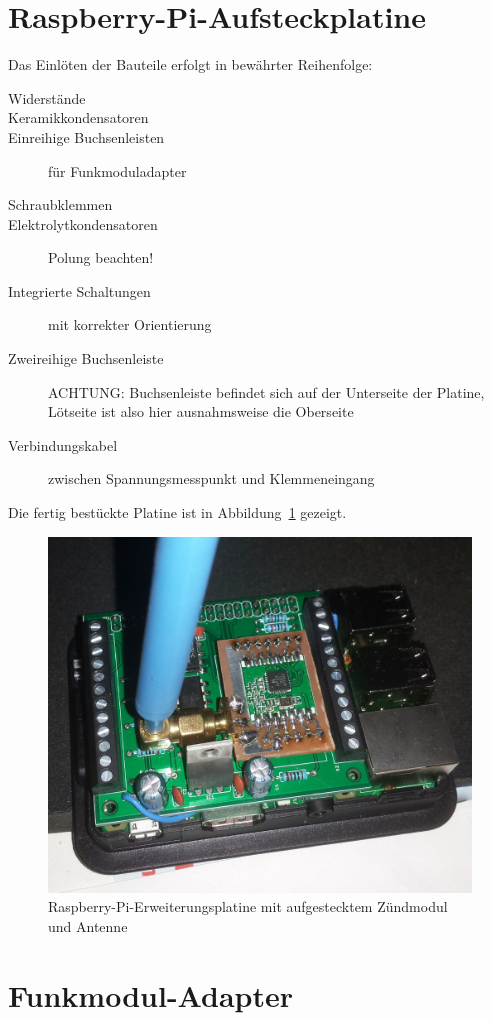 \documentclass[paper=a4, parskip, numbers=noenddot, toc=listof, headsepline]{scrbook}
\begin{document}
		\section{Raspberry-Pi-Aufsteckplatine}

			Das Einlöten der Bauteile erfolgt in bewährter Reihenfolge:
			\begin{description}
				\item[Widerstände]
				\item[Keramikkondensatoren]
				\item[Einreihige Buchsenleisten] für Funkmoduladapter
				\item[Schraubklemmen]
				\item[Elektrolytkondensatoren] Polung beachten!
				\item[Integrierte Schaltungen] mit korrekter Orientierung
				\item[Zweireihige Buchsenleiste] ACHTUNG: Buchsenleiste befindet sich auf der Unterseite der Platine, Lötseite ist also hier ausnahmsweise die Oberseite
				\item[Verbindungskabel] zwischen Spannungsmesspunkt und Klemmeneingang
			\end{description}

			Die fertig bestückte Platine ist in Abbildung~\ref{fig:raspiextension} gezeigt.

			\begin{figure}
				\centering
				\includegraphics[width=.7\textwidth]{bilder/Piplatine}
				\caption{Raspberry-Pi-Erweiterungsplatine mit aufgestecktem Zündmodul und Antenne}
				\label{fig:raspiextension}
			\end{figure}

		\section{Funkmodul-Adapter}
\end{document}
